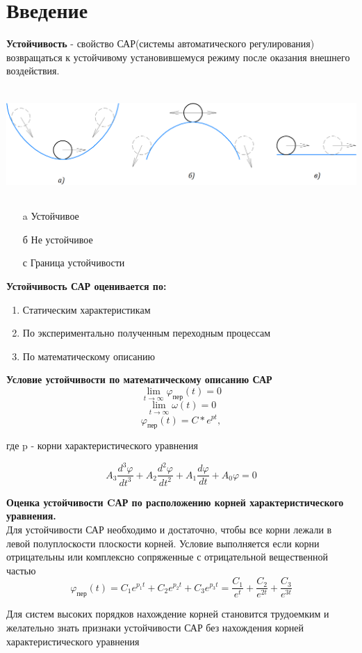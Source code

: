 \documentclass[12pt, a4paper]{report}
\begin{document}
\section*{Введение}
\textbf{Устойчивость} - свойство САР(системы автоматического регулирования) возвращаться к устойчивому установившемуся режиму после оказания внешнего воздействия. \\

\\

\includegraphics[width=15cm, height=4cm]{condition}\\
\begin{enumerate}
  \item[a] Устойчивое
  \item[б] Не устойчивое
  \item[с] Граница устойчивости
\end{enumerate}

\textbf{Устойчивость САР оценивается по:}
\begin{enumerate}
  \item Статическим характеристикам
  \item По экспериментально полученным переходным процессам
  \item По математическому описанию
\end{enumerate}

\textbf{Условие устойчивости по математическому описанию САР}
\[ \lim\limits_{ t\rightarrow\infty}{\varphi_{пер}(t)} = 0\]
\[ \lim\limits_{ t\rightarrow\infty}{\omega(t)} = 0\]
\[ \varphi_{пер}(t) = C * e^{pt}, \]
\centerline{где p - корни характеристического уравнения}
\begin{displaymath}
A_{3}\frac{d^{3}\varphi}{dt^{3}} + A_{2}\frac{d^{2}\varphi}{dt^{2}} + A_{1}\frac{d\varphi}{dt} + A_{0}\varphi = 0
\end{displaymath}

\textbf{Оценка устойчивости CАР по расположению корней характеристического уравнения.} \\
Для устойчивости САР необходимо и достаточно, чтобы все корни лежали в левой полуплоскости плоскости корней.
Условие выполняется если корни отрицательны или комплексно сопряженные с отрицательной вещественной частью
\begin{displaymath}
\varphi_{\text{пер}}(t) = C_{1}e^{p_{1}t} + C_{2}e^{p_{2}t} + C_{3}e^{p_{3}t} =
\frac{C_{1}}{e^{t}} + \frac{C_{2}}{e^{2t}} + \frac{C_{3}}{e^{3t}}
\end{displaymath}

\newpage
Для систем высоких порядков нахождение корней становится трудоемким и желательно знать признаки устойчивости
САР без нахождения корней характеристического уравнения
\end{document}
